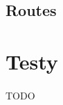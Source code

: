 \documentclass[wide,a4paper,titlepage,12pt] {article}
\begin{document}
    \subsection{Routes}
    \paragraph{}
      \small{
        
      }

      \section{Testy}
      \paragraph{}
      TODO




  
\end{document}
